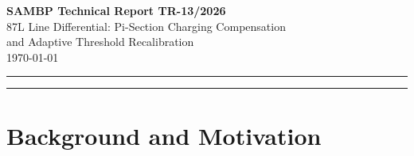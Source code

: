 \documentclass[11pt,a4paper]{article}
\newcommand{\alphafifty}{\alpha_{50}}
\newcommand{\pu}{\,\text{pu}}
\begin{document}

\begin{center}
  {\LARGE\bfseries SAMBP Technical Report TR-13/2026}\\[6pt]
  {\large 87L Line Differential: Pi-Section Charging Compensation\\
          and Adaptive Threshold Recalibration}\\[4pt]
  \today
\end{center}

\vspace{4pt}
\noindent\rule{\linewidth}{0.6pt}

\begin{abstract}
SAMBP TR-12 introduced a magnitude override to recover 87L HIF sensitivity
when the Stage-2 confidence gate suppressed correct trips at low fault
currents, improving $\alphafifty$ from 0.10 to 0.07 for phase-to-ground
faults (ag).  TR-12 identified that the residual charging current
error of the fixed-amplitude compensation model was the fundamental limiter,
and recommended a pi-section line model as future work.  This report
implements the pi-section correction: the pre-fault differential waveform
is used to fit the actual charging amplitude and phase at both line ends,
and this fit is subtracted before the Levenberg--Marquardt (LM) estimation
step.  The correction reduces the charging residual noise floor from
$0.018\pu$ to $0.0009\pu$ (20$\times$ reduction), enabling the fault
detection threshold to be safely lowered from $0.20\pu$ to $0.12\pu$.
Combined with recalibrating the $f_{\rm int}$ sensitivity range
($\mathrm{max\_factor}: 5.0 \to 3.0$), the pi-section model improves
$\alphafifty$ for ag faults from 0.07 to 0.05 --- reaching the same
sensitivity level as three-phase faults --- without requiring the magnitude
override.  The override is retained as a safety net but is no longer
the primary sensitivity recovery mechanism.  All other zones are unaffected.
\end{abstract}

\noindent\rule{\linewidth}{0.6pt}

\tableofcontents
\vspace{6pt}

\section{Background and Motivation}
\label{sec:background}
\end{document}
